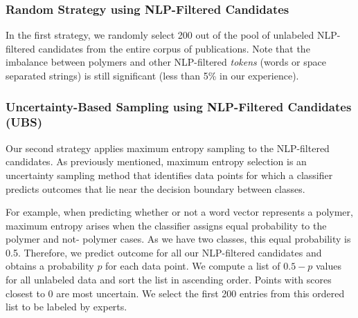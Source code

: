\subsubsection{Random Strategy using NLP-Filtered Candidates}
In the first strategy, we randomly select 200 out of the pool of unlabeled NLP-filtered candidates from the entire corpus of publications.
Note that the imbalance between polymers and other NLP-filtered \textit{tokens} (words or space separated strings)  is still significant (less than 5\% in our experience).

\subsubsection{Uncertainty-Based Sampling using NLP-Filtered Candidates (UBS)}
Our second strategy applies maximum entropy sampling to the NLP-filtered candidates. %
As previously mentioned, maximum entropy selection is an uncertainty sampling method that
identifies data points for which a classifier predicts outcomes that lie near the decision boundary 
between classes. 

For example, when predicting whether or not a word vector represents a polymer, maximum entropy arises when the classifier assigns equal probability to the polymer and not-
polymer cases.
As we have two classes, this equal probability is 0.5.
Therefore, we predict outcome for all our NLP-filtered candidates and obtains a probability $p$ for each data point. We compute a list of $0.5-p$ values for all unlabeled data and sort the list in ascending order.
Points with scores closest to $0$ are most uncertain.
We select the first 200 entries from this ordered list to be labeled by experts.


